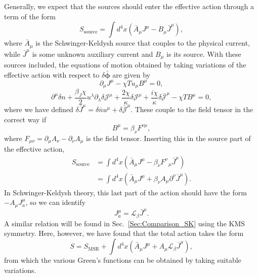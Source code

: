 \documentclass[aps,prd,nofootinbib,amsmath,amssymb,showpacs,longbibliography,singlecolumn,superscriptaddress,notitlepage]{revtex4-1}
\theoremstyle{plain}
\theoremstyle{definition}
\newcommand{\cvec}[1]{\ensuremath{\bm {#1}}}
\begin{document}
Generally, we expect that the sources should enter the effective action through a term of the form 
\begin{equation}
    S_{\mathrm{source}} = \int d^4x \left( \bar{A}_{\mu} J^{\mu} - B_{\mu} \bar{J}^{\mu} \right) ,
\end{equation}
where $\bar{A}_{\mu}$ is the Schwinger-Keldysh source that couples to the physical current, while $\bar{J}^{\mu}$ is some unknown auxiliary current and $B_{\mu}$ is its source. With these sources included, the equations of motion obtained by taking variations of the effective action with respect to $\delta \bar{\cvec{\phi}}$ are given by
\begin{equation}
    \partial_{\mu} J^{\mu} - \chi T u_{\mu} B^{\mu} = 0 ,
\end{equation}
\begin{equation}
    \partial^{\mu} \delta n + \frac{\beta_J \chi}{2} u^{\lambda} \partial_{\lambda} \delta \mathcal{J}^{\mu} + \frac{2\chi}{\kappa} \delta \mathcal{J}^{\mu} + \frac{i\chi}{\kappa} \delta \bar{\mathcal{J}}^{\mu} - \chi T B^{\mu} = 0 , 
\end{equation}
where we have defined $\delta \bar{J}^{\mu} = \delta \bar{n} u^{\mu} + \delta \bar{\mathcal{J}}^{\mu}$. These couple to the field tensor in the correct way if
\begin{equation}
    B^{\mu} = \beta_{\nu} F^{\nu\mu} ,
\end{equation}
where $F_{\mu\nu} = \partial_{\mu} A_{\nu} - \partial_{\nu} A_{\mu}$ is the field tensor. Inserting this in the source part of the effective action, 
\begin{equation}
\begin{split}
    S_{\mathrm{source}} & = \int d^4x \left( \bar{A}_{\mu} J^{\mu} - \beta_{\nu} F^{\nu}_{\:\:\: \mu} \bar{J}^{\mu} \right) \\
    & = \int d^4x \left( \bar{A}_{\mu} J^{\mu} + \beta_{\nu} A_{\mu} \partial^{\nu} \bar{J}^{\mu} \right) .
\end{split}
\end{equation}
In Schwinger-Keldysh theory, this last part of the action should have the form $-A_{\mu} J_a^{\mu}$, so we can identify
\begin{equation} \label{current_matching}
    J_a^{\mu} = \mathcal{L}_{\beta} \bar{J}^{\mu} . 
\end{equation}
A similar relation will be found in Sec.\ \ref{Sec:Comparison_SK} using the KMS symmetry. Here, however, we have found that the total action takes the form 
\begin{equation}
    S = S_{\mathrm{MSR}} + \int d^4x \left( \bar{A}_{\mu} J^{\mu} + A_{\mu} \mathcal{L}_{\beta} \bar{J}^{\mu} \right) ,
\end{equation}
from which the various Green's functions can be obtained by taking suitable variations. 
\end{document}
